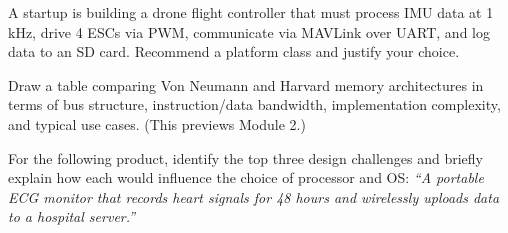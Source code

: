 \begin{exercise}
A startup is building a drone flight controller that must process IMU data at 1\,kHz, drive 4 ESCs via PWM, communicate via MAVLink over UART, and log data to an SD card. Recommend a platform class and justify your choice.
\end{exercise}

\begin{exercise}
Draw a table comparing Von Neumann and Harvard memory architectures in terms of bus structure, instruction/data bandwidth, implementation complexity, and typical use cases. (This previews Module 2.)
\end{exercise}

\begin{exercise}
For the following product, identify the top three design challenges and briefly explain how each would influence the choice of processor and OS:
\emph{``A portable ECG monitor that records heart signals for 48 hours and wirelessly uploads data to a hospital server.''}
\end{exercise}
